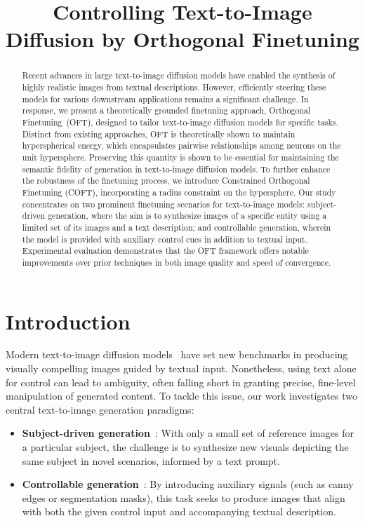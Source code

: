 \title{Controlling Text-to-Image Diffusion by Orthogonal Finetuning}

\begin{abstract}
Recent advances in large text-to-image diffusion models have enabled the synthesis of highly realistic images from textual descriptions. However, efficiently steering these models for various downstream applications remains a significant challenge. In response, we present a theoretically grounded finetuning approach, Orthogonal Finetuning~(OFT), designed to tailor text-to-image diffusion models for specific tasks. Distinct from existing approaches, OFT is theoretically shown to maintain hyperspherical energy, which encapsulates pairwise relationships among neurons on the unit hypersphere. Preserving this quantity is shown to be essential for maintaining the semantic fidelity of generation in text-to-image diffusion models. To further enhance the robustness of the finetuning process, we introduce Constrained Orthogonal Finetuning (COFT), incorporating a radius constraint on the hypersphere. Our study concentrates on two prominent finetuning scenarios for text-to-image models: subject-driven generation, where the aim is to synthesize images of a specific entity using a limited set of its images and a text description; and controllable generation, wherein the model is provided with auxiliary control cues in addition to textual input. Experimental evaluation demonstrates that the OFT framework offers notable improvements over prior techniques in both image quality and speed of convergence.
\end{abstract}

\section{Introduction}

Modern text-to-image diffusion models~\cite{saharia2022photorealistic,ramesh2022hierarchical,rombach2022high} have set new benchmarks in producing visually compelling images guided by textual input. Nonetheless, using text alone for control can lead to ambiguity, often falling short in granting precise, fine-level manipulation of generated content. To tackle this issue, our work investigates two central text-to-image generation paradigms:

\begin{itemize}[leftmargin=*,nosep]

    \item \textbf{Subject-driven generation}~\cite{ruiz2023dreambooth}: With only a small set of reference images for a particular subject, the challenge is to synthesize new visuals depicting the same subject in novel scenarios, informed by a text prompt.
    \item \textbf{Controllable generation}~\cite{zhang2023adding,mou2023t2i}: By introducing auxiliary signals (such as canny edges or segmentation masks), this task seeks to produce images that align with both the given control input and accompanying textual description.
\end{itemize}

